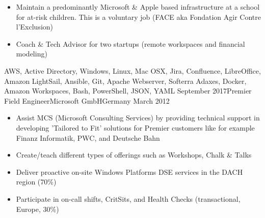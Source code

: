 \begin{experiences}
{\begin{itemize}
                        \item Maintain a predominantly Microsoft \& Apple based infrastructure at a school for at-risk children. This is a voluntary job (FACE aka Fondation Agir Contre l'Exclusion)

                        \item Coach \& Tech Advisor for two startups (remote workspaces and financial modeling)            
                      \end{itemize}
                    }
                    {AWS, Active Directory, Windows, Linux, Mac OSX, Jira, Confluence, LibreOffice, Amazon LightSail, Ansible, Git, Apache Webserver, Softerra Adaxes, Docker, Amazon Workspaces, Bash, PowerShell, JSON, YAML}
  \emptySeparator
  \experience
    {September 2017}{Premier Field Engineer}{Microsoft GmbH}{Germany}
    {March 2012}    {
                      \begin{itemize}
                        \item Assist MCS (Microsoft Consulting Services) by providing technical support in developing 'Tailored to Fit' solutions for Premier customers like for example Finanz Informatik, PWC, and Deutsche Bahn

                        \item Create/teach different types of offerings such as Workshops, Chalk \& Talks  
                        
                        \item Deliver proactive on-site Windows Platforms DSE services in the DACH region (70\%)                   
 
                        \item Participate in on-call shifts, CritSits, and Health Checks (transactional, Europe, 30\%)    


\end{itemize}}
\end{experiences}
